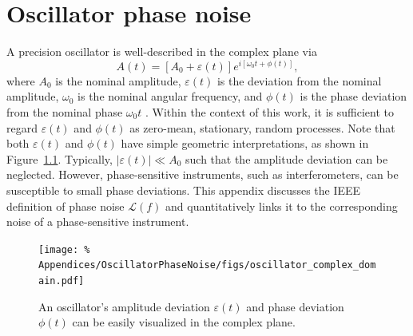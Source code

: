\chapter{Oscillator phase noise}
\label{app:OscillatorPhaseNoise}
A precision oscillator is well-described in the complex plane via
\begin{equation}
  A(t)
  =
  \left[ A_0 + \varepsilon(t) \right]
  e^{i \left[ \omega_0 t + \phi(t) \right]},
\end{equation}
where
$A_0$ is the nominal amplitude,
$\varepsilon(t)$ is the deviation from the nominal amplitude,
$\omega_0$ is the nominal angular frequency, and
$\phi(t)$ is the phase deviation from the nominal phase $\omega_0 t$
\cite{ieee_std1139}.
Within the context of this work,
it is sufficient to regard $\varepsilon(t)$ and $\phi(t)$
as zero-mean, stationary, random processes.
Note that both $\varepsilon(t)$ and $\phi(t)$
have simple geometric interpretations,
as shown in Figure~\ref{fig:OscillatorPhaseNoise:oscillator_complex_plane}.
Typically, $|\varepsilon(t)| \ll A_0$ such that
the amplitude deviation can be neglected.
However, phase-sensitive instruments,
such as interferometers,
can be susceptible to small phase deviations.
This appendix discusses
the IEEE definition of phase noise $\mathcal{L}(f)$ and
quantitatively links it
to the corresponding noise of a phase-sensitive instrument.

\begin{figure}[h]
  \centering
  \texttt{[image: \%
    Appendices/OscillatorPhaseNoise/figs/oscillator\_complex\_domain.pdf]}
  \caption[Oscillator amplitude and phase deviations in the complex plane]{%
    An oscillator's amplitude deviation $\varepsilon(t)$ and
    phase deviation $\phi(t)$ can be easily visualized in the complex plane.}
\label{fig:OscillatorPhaseNoise:oscillator_complex_plane}
\end{figure}



